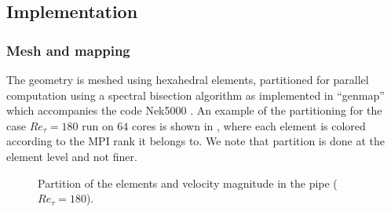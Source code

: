 \documentclass{sig-alternate}
\begin{document}


\subsection{Implementation}
\label{sec:implementation}

\subsubsection{Mesh and mapping}
\label{sec:code}
The geometry is meshed using hexahedral elements, partitioned for parallel
computation using a spectral bisection algorithm as implemented in ``genmap''
which accompanies the code Nek5000 \cite{argonne:nekdoc}. An example of the
partitioning for the case $Re_{\tau} = 180$ run on $64$ cores is shown in , where each element is colored according to the MPI rank it belongs to. We note that partition is done at the element level and not finer.
\begin{figure}
  \centering
  \caption{Partition of the elements and velocity magnitude in the pipe ($Re_{\tau}=180$).}
  \label{fig:partition}
\end{figure}
 
\end{document}
